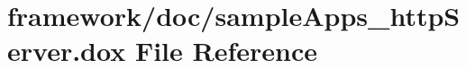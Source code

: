 \hypertarget{sample_apps__http_server_8dox}{}\section{framework/doc/sample\+Apps\+\_\+http\+Server.dox File Reference}
\label{sample_apps__http_server_8dox}
